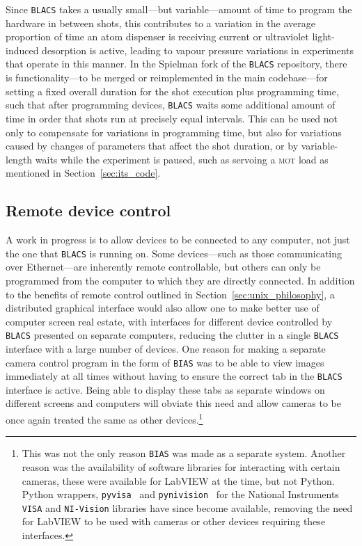 Since \texttt{BLACS} takes a usually small---but variable---amount of time to program the hardware in between shots, this contributes to a variation in the average proportion of time an atom dispenser is receiving current or ultraviolet light-induced desorption is active, leading to vapour pressure variations in experiments that operate in this manner. In the Spielman fork of the \texttt{BLACS} repository, there is functionality---to be merged or reimplemented in the main codebase---for setting a fixed overall duration for the shot execution plus programming time, such that after programming devices, \texttt{BLACS} waits some additional amount of time in order that shots run at precisely equal intervals. This can be used not only to compensate for variations in programming time, but also for variations caused by changes of parameters that affect the shot duration, or by variable-length waits while the experiment is paused, such as servoing a \textsc{mot} load as mentioned in Section~\ref{sec:its_code}.

\subsection{Remote device control}

A work in progress is to allow devices to be connected to any computer, not just the one that \texttt{BLACS} is running on. Some devices---such as those communicating over Ethernet---are inherently remote controllable, but others can only be programmed from the computer to which they are directly connected. In addition to the benefits of remote control outlined in Section~\ref{sec:unix_philosophy}, a distributed graphical interface would also allow one to make better use of computer screen real estate, with interfaces for different device controlled by \texttt{BLACS} presented on separate computers, reducing the clutter in a single \texttt{BLACS} interface with a large number of devices. One reason for making a separate camera control program in the form of \texttt{BIAS} was to be able to view images immediately at all times without having to ensure the correct tab in the \texttt{BLACS} interface is active. Being able to display these tabs as separate windows on different screens and computers will obviate this need and allow cameras to be once again treated the same as other devices.\footnote{This was not the only reason \texttt{BIAS} was made as a separate system. Another reason was the availability of software libraries for interacting with certain cameras, these were available for LabVIEW at the time, but not Python. Python wrappers, \texttt{pyvisa}~\cite{torsten_bronger_pyvisa_2018} and \texttt{pynivision}~\cite{peter_johnson_frc_team_294_pynivision_2015} for the National Instruments \texttt{VISA} and \texttt{NI-Vision} libraries have since become available, removing the need for LabVIEW to be used with cameras or other devices requiring these interfaces.}

